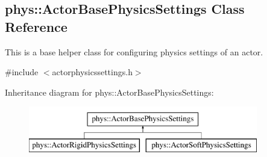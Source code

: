 \hypertarget{classphys_1_1ActorBasePhysicsSettings}{
\subsection{phys::ActorBasePhysicsSettings Class Reference}
\label{classphys_1_1ActorBasePhysicsSettings}
}


This is a base helper class for configuring physics settings of an actor.  




{\ttfamily \#include $<$actorphysicssettings.h$>$}

Inheritance diagram for phys::ActorBasePhysicsSettings:\begin{figure}[H]
\begin{center}
\leavevmode
\includegraphics[height=2.000000cm]{classphys_1_1ActorBasePhysicsSettings}
\end{center}
\end{figure}
